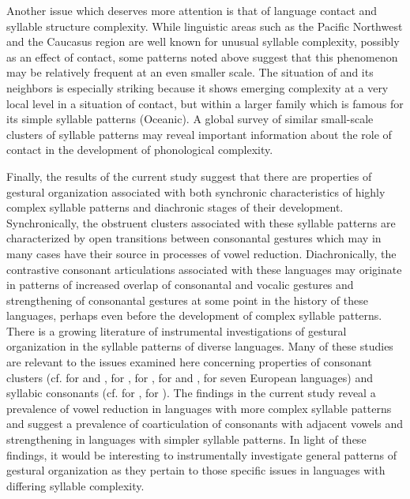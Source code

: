   Another issue which deserves more attention is that of language contact and syllable structure complexity. While linguistic areas such as the Pacific Northwest and the Caucasus region are well known for unusual syllable complexity, possibly as an effect of contact, some patterns noted above suggest that this phenomenon may be relatively frequent at an even smaller scale. The situation of  and its neighbors is especially striking because it shows emerging complexity at a very local level in a situation of contact, but within a larger family which is famous for its simple syllable patterns (Oceanic). A global survey of similar small-scale clusters of syllable patterns may reveal important information about the role of contact in the development of phonological complexity.

  Finally, the results of the current study suggest that there are properties of gestural organization associated with both synchronic characteristics of highly complex syllable patterns and diachronic stages of their development. Synchronically, the obstruent clusters associated with these syllable patterns are characterized by open transitions between consonantal gestures which may in many cases have their source in processes of vowel reduction. Diachronically, the contrastive consonant articulations associated with these languages may originate in patterns of increased overlap of consonantal and vocalic gestures and strengthening of consonantal gestures at some point in the history of these languages, perhaps even before the development of complex syllable patterns. There is a growing literature of instrumental investigations of gestural organization in the syllable patterns of diverse languages. Many of these studies are relevant to the issues examined here concerning properties of consonant clusters (cf. \citealt{GoldsteinEtAl2007} for  and , \citealt{HermesEtAl2013} for , \citealt{Marin2014} for , \citealt{Butler2015} for  and , \citealt{MarinEtAl2017} for seven European languages) and syllabic consonants (cf. \citealt{HermesEtAl2011} for , \citealt{PouplierBeňuš2011} for ). The findings in the current study reveal a prevalence of vowel reduction in languages with more complex syllable patterns and suggest a prevalence of coarticulation of consonants with adjacent vowels and strengthening in languages with simpler syllable patterns. In light of these findings, it would be interesting to instrumentally investigate general patterns of gestural organization as they pertain to those specific issues in languages with differing syllable complexity.

 
